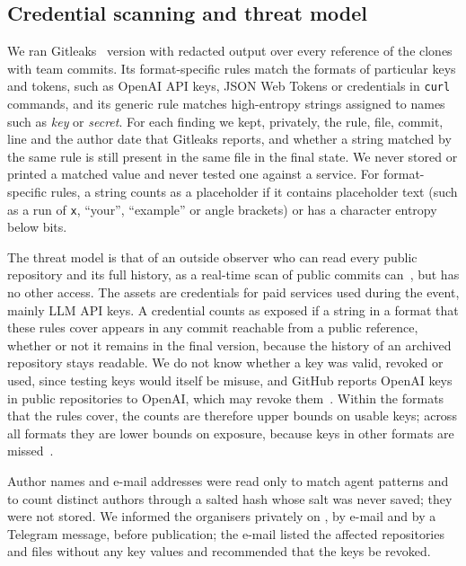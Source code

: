 \documentclass{article}
\begin{document}
\subsection{Credential scanning and threat model}\label{sec:credentials}
We ran Gitleaks~\cite{gitleaks2026} version \gitleaksversion{} with redacted output over every reference of the \NRqFourScannedRepos{} clones with team commits. Its format-specific rules match the formats of particular keys and tokens, such as OpenAI API keys, JSON Web Tokens or credentials in \texttt{curl} commands, and its generic rule matches high-entropy strings assigned to names such as \emph{key} or \emph{secret}. For each finding we kept, privately, the rule, file, commit, line and the author date that Gitleaks reports, and whether a string matched by the same rule is still present in the same file in the final state. We never stored or printed a matched value and never tested one against a service. For format-specific rules, a string counts as a placeholder if it contains placeholder text (such as a run of \texttt{x}, ``your'', ``example'' or angle brackets) or has a character entropy below \entropythr{} bits.

The threat model is that of an outside observer who can read every public repository and its full history, as a real-time scan of public commits can~\cite{meli2019git}, but has no other access. The assets are credentials for paid services used during the event, mainly LLM API keys. A credential counts as exposed if a string in a format that these rules cover appears in any commit reachable from a public reference, whether or not it remains in the final version, because the history of an archived repository stays readable. We do not know whether a key was valid, revoked or used, since testing keys would itself be misuse, and GitHub reports OpenAI keys in public repositories to OpenAI, which may revoke them~\cite{github2026partners}. Within the formats that the rules cover, the counts are therefore upper bounds on usable keys; across all formats they are lower bounds on exposure, because keys in other formats are missed~\cite{basak2023tools}.

Author names and e-mail addresses were read only to match agent patterns and to count distinct authors through a salted hash whose salt was never saved; they were not stored. We informed the organisers privately on \disclosuredate{}, by e-mail and by a Telegram message, before publication; the e-mail listed the affected repositories and files without any key values and recommended that the keys be revoked.
\end{document}
